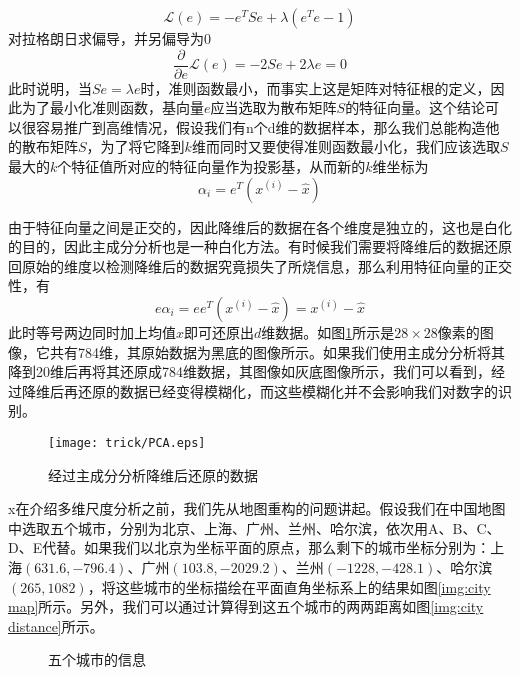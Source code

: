 \begin{equation}
\mathcal{L}(e) = - e^TSe + \lambda(e^Te-1)
\end{equation}
对拉格朗日求偏导，并另偏导为0
\begin{equation}
\frac{\partial}{\partial e} \mathcal{L}(e) = -2Se + 2\lambda e = 0
\end{equation}
此时说明，当$Se = \lambda e$时，准则函数最小，而事实上这是矩阵对特征根的定义，因此为了最小化准则函数，基向量$e$应当选取为散布矩阵$S$的特征向量。这个结论可以很容易推广到高维情况，假设我们有n个d维的数据样本，那么我们总能构造他的散布矩阵$S$，为了将它降到$k$维而同时又要使得准则函数最小化，我们应该选取$S$最大的$k$个特征值所对应的特征向量作为投影基，从而新的$k$维坐标为
\begin{equation}
\alpha_i = e^T(x^{(i)} - \hat{x})
\end{equation}

由于特征向量之间是正交的，因此降维后的数据在各个维度是独立的，这也是白化的目的，因此主成分分析也是一种白化方法。有时候我们需要将降维后的数据还原回原始的维度以检测降维后的数据究竟损失了所烧信息，那么利用特征向量的正交性，有
\begin{equation}
e\alpha_i = ee^T(x^{(i)} - \hat{x}) = x^{(i)} - \hat{x}
\end{equation}
此时等号两边同时加上均值$\hat{x}$即可还原出$d$维数据。如图\ref{img:PCA reconstruct}所示是$28\times 28$像素的图像，它共有784维，其原始数据为黑底的图像所示。如果我们使用主成分分析将其降到20维后再将其还原成784维数据，其图像如灰底图像所示，我们可以看到，经过降维后再还原的数据已经变得模糊化，而这些模糊化并不会影响我们对数字的识别。

\begin{figure}[!htbp]
\centering
\texttt{[image: trick/PCA.eps]}
\caption{经过主成分分析降维后还原的数据}
\label{img:PCA reconstruct}
\end{figure}


x在介绍多维尺度分析之前，我们先从地图重构的问题讲起。假设我们在中国地图中选取五个城市，分别为北京、上海、广州、兰州、哈尔滨，依次用A、B、C、D、E代替。如果我们以北京为坐标平面的原点，那么剩下的城市坐标分别为：上海$(631.6, -796.4)$、广州$(103.8, -2029.2)$、兰州$(-1228, -428.1)$、哈尔滨$(265, 1082)$，将这些城市的坐标描绘在平面直角坐标系上的结果如图\ref{img:city map}所示。另外，我们可以通过计算得到这五个城市的两两距离如图\ref{img:city distance}所示。
\begin{figure}[htbp]
\centering
\subfigure{\label{img:city map}}\addtocounter{subfigure}{-2}
\subfigure{\label{img:city distance}}\addtocounter{subfigure}{-2}
\caption{五个城市的信息}
\vspace{-1em}
\end{figure}

